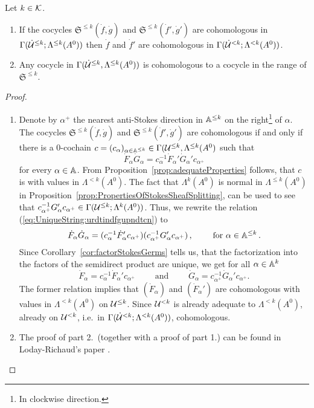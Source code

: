 \begin{lem}
  Let $k\in\mathcal{K}$.
  \begin{enumerate}
    \item If the cocycles $\mathfrak{S}^{\leq k}(\dot f,\dot g)$ and
      $\mathfrak{S}^{\leq k}(\dot f',\dot g')$ are cohomologous in
      $\Gamma(\dot{\mathcal{U}}^{\leq k};\Lambda^{\leq k}(A^0))$
      then $\dot f$ and $\dot f'$ are cohomologous in
      $\Gamma(\dot{\mathcal{U}}^{<k};\Lambda^{<k}(A^0))$.
    \item Any cocycle in $\Gamma(\dot{\mathcal{U}}^{\leq k},\Lambda^{\leq k}(A^0))$ is
      cohomologous to a cocycle in the range of $\mathfrak{S}^{\leq k}$.
  \end{enumerate}
\end{lem}
\begin{proof}
  \begin{enumerate}
    \item Denote by $\alpha^+$ the nearest anti-Stokes direction in
      $\mathbb{A}^{\leq k}$ on the right\footnote{In clockwise direction.} of $\alpha$.
      The cocycles $\mathfrak{S}^{\leq k}(\dot f,\dot g)$ and
      $\mathfrak{S}^{\leq k}(\dot f',\dot g')$ are cohomologous if and only
      if there is a $0$-cochain $c=(c_\alpha)_{\alpha\in\mathbb{A}^{\leq k}}
      \in\Gamma(\mathcal{U}^{\leq k},\Lambda^{\leq k}(A^0)$ such that
      \begin{equation}\label{eq:UniqueString:urdtindfgupndtcn}
        \dot F_\alpha\dot G_\alpha =
        c_\alpha^{-1}\dot F_\alpha'\dot G_\alpha'c_{\alpha^+}
      \end{equation}
      for every $\alpha\in\mathbb{A}$. From Proposition~\ref{prop:adequateProperties}
      follows, that $c$ is with values in $\Lambda^{<k}(A^0)$.
      The fact that $\Lambda^k(A^0)$ is normal in $\Lambda^{\leq k}(A^0)$ in
      Proposition~\ref{prop:PropertiesOfStokesSheafSplitting}, can be used to
      see that $ c_{\alpha^+}^{-1}G_\alpha'c_{\alpha^+}
      \in\Gamma(\mathcal{U}^{\leq k};\Lambda^{k}(A^0))$.
      Thus, we rewrite the relation (\ref{eq:UniqueString:urdtindfgupndtcn}) to
      \[
        \dot F_\alpha\dot G_\alpha =
        (c_\alpha^{-1}\dot F_\alpha'c_{\alpha^+})
        (c_{\alpha^+}^{-1}G_\alpha'c_{\alpha^+})
        \,,\qquad\text{~for~} \alpha\in\mathbb{A}^{\leq k} \,.
      \]
      Since Corollary~\ref{cor:factorStokesGerms} tells us, that the
      factorization into the factors of the semidirect product are unique, we
      get for all $\alpha\in\mathbb{A}^k$
      \[
        \dot F_\alpha=c_\alpha^{-1}\dot F_\alpha'c_{\alpha^+}
        \qquad \text{~and~} \qquad
        \dot G_\alpha=c_{\alpha^+}^{-1}\dot G_\alpha'c_{\alpha^+}.
      \]
      The former relation implies that $(\dot F_\alpha)$ and $(\dot F_\alpha')$
      are cohomologous with values in $\Lambda^{<k}(A^0)$ on $\mathcal{U}^{\leq k}$.
      Since $\mathcal{U}^{<k}$ is already adequate to $\Lambda^{<k}(A^0)$,  already on $\mathcal{U}^{<k}$,
      i.e.\ in $\Gamma(\dot{\mathcal{U}}^{<k};\Lambda^{<k}(A^0))$, cohomologous.
    \item The proof of part 2.\ (together with a proof of part 1.) can be
      found in Loday-Richaud's paper \cite[Proof of Lem.II.3.3]{Loday1994}.
  \end{enumerate}
\end{proof}

